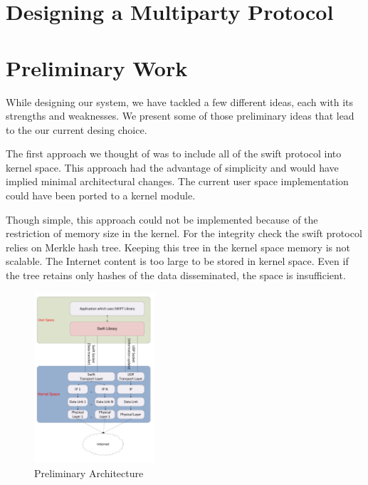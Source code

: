 
\section{Designing a Multiparty Protocol}
\label{sec:multiparty:design}


\section{Preliminary Work}
\label{sec:multiparty:preliminary-work}

While designing our system, we have tackled a few different ideas, each with
its strengths and weaknesses. We present some of those preliminary ideas
that lead to the our current desing choice.

The first approach we thought of was to include all of the swift protocol into
kernel space. This approach had the advantage of simplicity and would have
implied minimal architectural changes. The current user space implementation
could have been ported to a kernel module.

Though simple, this approach could not be implemented because of the
restriction of memory size in the kernel.  For the integrity check the swift
protocol relies on Merkle hash tree. Keeping this tree in the kernel space
memory is not scalable. The Internet content is too large to be stored in
kernel space. Even if the tree retains only hashes of the data disseminated, the
space is insufficient.

\begin{figure}
  \centering
  \includegraphics[width=0.4\textwidth]{src/img/multiparty/preliminary-architecture}
  \caption{Preliminary Architecture}
  \label{fig:multiparty:preliminary-architecture}
\end{figure}

